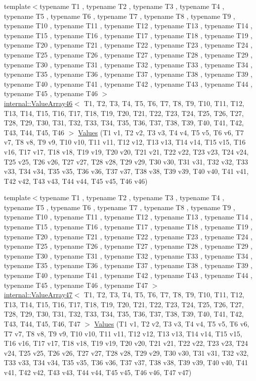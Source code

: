 \begin{DoxyCompactItemize}
\item 
{\footnotesize template$<$typename T1 , typename T2 , typename T3 , typename T4 , typename T5 , typename T6 , typename T7 , typename T8 , typename T9 , typename T10 , typename T11 , typename T12 , typename T13 , typename T14 , typename T15 , typename T16 , typename T17 , typename T18 , typename T19 , typename T20 , typename T21 , typename T22 , typename T23 , typename T24 , typename T25 , typename T26 , typename T27 , typename T28 , typename T29 , typename T30 , typename T31 , typename T32 , typename T33 , typename T34 , typename T35 , typename T36 , typename T37 , typename T38 , typename T39 , typename T40 , typename T41 , typename T42 , typename T43 , typename T44 , typename T45 , typename T46 $>$ }\\\mbox{\hyperlink{classtesting_1_1internal_1_1_value_array46}{internal\+::\+Value\+Array46}}$<$ T1, T2, T3, T4, T5, T6, T7, T8, T9, T10, T11, T12, T13, T14, T15, T16, T17, T18, T19, T20, T21, T22, T23, T24, T25, T26, T27, T28, T29, T30, T31, T32, T33, T34, T35, T36, T37, T38, T39, T40, T41, T42, T43, T44, T45, T46 $>$ \mbox{\hyperlink{namespacetesting_a8f5536906a9d6780467c8ae53a420dad}{Values}} (T1 v1, T2 v2, T3 v3, T4 v4, T5 v5, T6 v6, T7 v7, T8 v8, T9 v9, T10 v10, T11 v11, T12 v12, T13 v13, T14 v14, T15 v15, T16 v16, T17 v17, T18 v18, T19 v19, T20 v20, T21 v21, T22 v22, T23 v23, T24 v24, T25 v25, T26 v26, T27 v27, T28 v28, T29 v29, T30 v30, T31 v31, T32 v32, T33 v33, T34 v34, T35 v35, T36 v36, T37 v37, T38 v38, T39 v39, T40 v40, T41 v41, T42 v42, T43 v43, T44 v44, T45 v45, T46 v46)
\item 
{\footnotesize template$<$typename T1 , typename T2 , typename T3 , typename T4 , typename T5 , typename T6 , typename T7 , typename T8 , typename T9 , typename T10 , typename T11 , typename T12 , typename T13 , typename T14 , typename T15 , typename T16 , typename T17 , typename T18 , typename T19 , typename T20 , typename T21 , typename T22 , typename T23 , typename T24 , typename T25 , typename T26 , typename T27 , typename T28 , typename T29 , typename T30 , typename T31 , typename T32 , typename T33 , typename T34 , typename T35 , typename T36 , typename T37 , typename T38 , typename T39 , typename T40 , typename T41 , typename T42 , typename T43 , typename T44 , typename T45 , typename T46 , typename T47 $>$ }\\\mbox{\hyperlink{classtesting_1_1internal_1_1_value_array47}{internal\+::\+Value\+Array47}}$<$ T1, T2, T3, T4, T5, T6, T7, T8, T9, T10, T11, T12, T13, T14, T15, T16, T17, T18, T19, T20, T21, T22, T23, T24, T25, T26, T27, T28, T29, T30, T31, T32, T33, T34, T35, T36, T37, T38, T39, T40, T41, T42, T43, T44, T45, T46, T47 $>$ \mbox{\hyperlink{namespacetesting_aba2697b2cd3e9d667ab3807022303240}{Values}} (T1 v1, T2 v2, T3 v3, T4 v4, T5 v5, T6 v6, T7 v7, T8 v8, T9 v9, T10 v10, T11 v11, T12 v12, T13 v13, T14 v14, T15 v15, T16 v16, T17 v17, T18 v18, T19 v19, T20 v20, T21 v21, T22 v22, T23 v23, T24 v24, T25 v25, T26 v26, T27 v27, T28 v28, T29 v29, T30 v30, T31 v31, T32 v32, T33 v33, T34 v34, T35 v35, T36 v36, T37 v37, T38 v38, T39 v39, T40 v40, T41 v41, T42 v42, T43 v43, T44 v44, T45 v45, T46 v46, T47 v47)

\end{DoxyCompactItemize}
